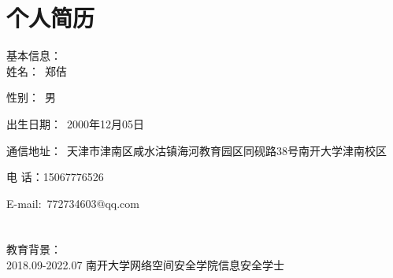 

\chapter*{个人简历}

\noindent 基本信息：\\

 姓名：~郑佶

 性别：~男 

 出生日期：~2000年12月05日

 通信地址：~天津市津南区咸水沽镇海河教育园区同砚路38号南开大学津南校区

 电  话：15067776526

 E-mail:~772734603@qq.com \\ \\
\\
教育背景：\\  

2018.09-2022.07 \quad 南开大学\quad 网络空间安全学院\quad\quad 信息安全\quad\quad 学士 \\ 
\\
